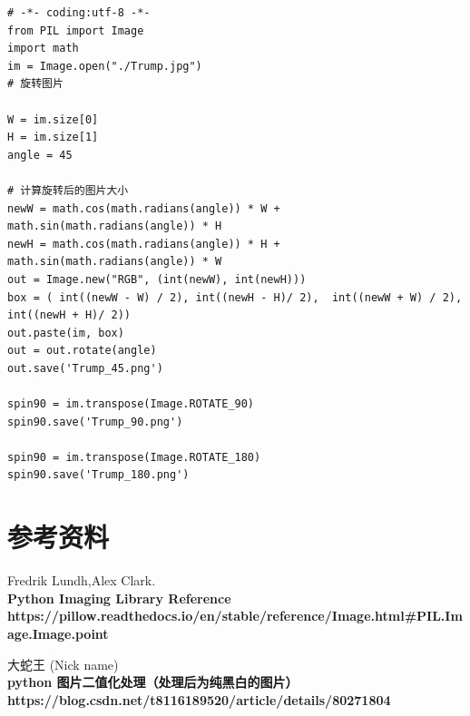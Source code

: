 \documentclass[11pt]{ctexart}
\begin{document}
\lstset{language=python}
\begin{lstlisting}
# -*- coding:utf-8 -*-
from PIL import Image
import math
im = Image.open("./Trump.jpg")
# 旋转图片

W = im.size[0]
H = im.size[1]
angle = 45

# 计算旋转后的图片大小
newW = math.cos(math.radians(angle)) * W + math.sin(math.radians(angle)) * H
newH = math.cos(math.radians(angle)) * H + math.sin(math.radians(angle)) * W
out = Image.new("RGB", (int(newW), int(newH)))
box = ( int((newW - W) / 2), int((newH - H)/ 2),  int((newW + W) / 2), int((newH + H)/ 2))
out.paste(im, box)
out = out.rotate(angle)
out.save('Trump_45.png')

spin90 = im.transpose(Image.ROTATE_90)
spin90.save('Trump_90.png')

spin90 = im.transpose(Image.ROTATE_180)
spin90.save('Trump_180.png')
\end{lstlisting}

\section{参考资料}

\begin{thebibliography}{99}

 Fredrik Lundh,Alex Clark.\\
{\bf Python Imaging Library Reference\\}
{\bf https://pillow.readthedocs.io/en/stable/reference/Image.html\#PIL.Image.Image.point\\}

大蛇王 (Nick name)\\
{\bf python 图片二值化处理（处理后为纯黑白的图片）\\}
{\bf https://blog.csdn.net/t8116189520/article/details/80271804\\}
\end{thebibliography}
\end{document}

